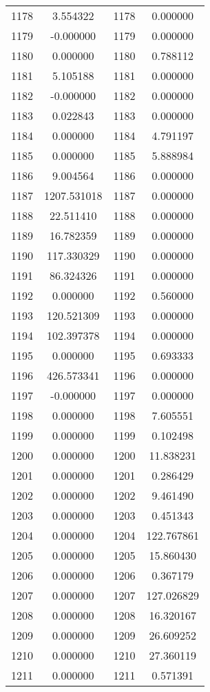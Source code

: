 \documentclass[12pt]{article}
\begin{document}
\begin{longtable}{@{}cccc@{}}
1178 & 3.554322 & 1178 & 0.000000 \\
1179 & -0.000000 & 1179 & 0.000000 \\
1180 & 0.000000 & 1180 & 0.788112 \\
1181 & 5.105188 & 1181 & 0.000000 \\
1182 & -0.000000 & 1182 & 0.000000 \\
1183 & 0.022843 & 1183 & 0.000000 \\
1184 & 0.000000 & 1184 & 4.791197 \\
1185 & 0.000000 & 1185 & 5.888984 \\
1186 & 9.004564 & 1186 & 0.000000 \\
1187 & 1207.531018 & 1187 & 0.000000 \\
1188 & 22.511410 & 1188 & 0.000000 \\
1189 & 16.782359 & 1189 & 0.000000 \\
1190 & 117.330329 & 1190 & 0.000000 \\
1191 & 86.324326 & 1191 & 0.000000 \\
1192 & 0.000000 & 1192 & 0.560000 \\
1193 & 120.521309 & 1193 & 0.000000 \\
1194 & 102.397378 & 1194 & 0.000000 \\
1195 & 0.000000 & 1195 & 0.693333 \\
1196 & 426.573341 & 1196 & 0.000000 \\
1197 & -0.000000 & 1197 & 0.000000 \\
1198 & 0.000000 & 1198 & 7.605551 \\
1199 & 0.000000 & 1199 & 0.102498 \\
1200 & 0.000000 & 1200 & 11.838231 \\
1201 & 0.000000 & 1201 & 0.286429 \\
1202 & 0.000000 & 1202 & 9.461490 \\
1203 & 0.000000 & 1203 & 0.451343 \\
1204 & 0.000000 & 1204 & 122.767861 \\
1205 & 0.000000 & 1205 & 15.860430 \\
1206 & 0.000000 & 1206 & 0.367179 \\
1207 & 0.000000 & 1207 & 127.026829 \\
1208 & 0.000000 & 1208 & 16.320167 \\
1209 & 0.000000 & 1209 & 26.609252 \\
1210 & 0.000000 & 1210 & 27.360119 \\
1211 & 0.000000 & 1211 & 0.571391 \\

\end{longtable}
\end{document}
